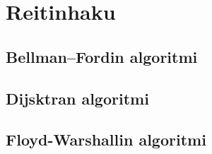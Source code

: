 \chapter{Reitinhaku}

\section{Bellman–Fordin algoritmi}

\section{Dijsktran algoritmi}

\section{Floyd-Warshallin algoritmi}
